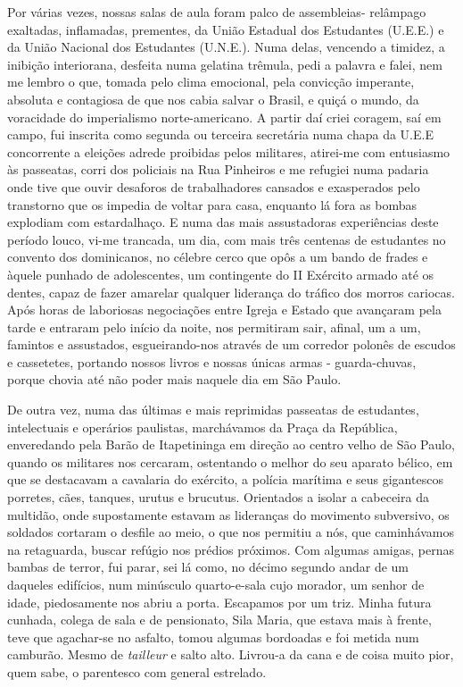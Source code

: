 Por várias vezes, nossas salas de aula foram palco de assembleias- relâmpago exaltadas, inflamadas, prementes, da União Estadual dos Estudantes (U.E.E.) e da União Nacional dos Estudantes (U.N.E.).
Numa delas, vencendo a timidez, a inibição interiorana, desfeita numa gelatina trêmula, pedi a palavra e falei, nem me lembro o que, tomada pelo clima emocional, pela convicção imperante, absoluta e contagiosa de que nos cabia salvar o Brasil, e quiçá o mundo, da voracidade do imperialismo norte-americano.
A partir daí criei coragem, saí em campo, fui inscrita como segunda ou terceira secretária numa chapa da U.E.E concorrente a eleições adrede proibidas pelos militares, atirei-me com entusiasmo às passeatas, corri dos policiais na Rua Pinheiros e me refugiei numa padaria onde tive que ouvir desaforos de trabalhadores cansados e exasperados pelo transtorno que os impedia de voltar para casa, enquanto lá fora as bombas explodiam com estardalhaço.
E numa das mais assustadoras experiências deste período louco, vi-me trancada, um dia, com mais três centenas de estudantes no convento dos dominicanos, no célebre cerco que opôs a um bando de frades e àquele punhado de adolescentes, um contingente do II Exército armado até os dentes, capaz de fazer amarelar qualquer liderança do tráfico dos morros cariocas.
Após horas de laboriosas negociações entre Igreja e Estado que avançaram pela tarde e entraram pelo início da noite, nos permitiram sair, afinal, um a um, famintos e assustados, esgueirando-nos através de um corredor polonês de escudos e cassetetes, portando nossos livros e nossas únicas armas - guarda-chuvas, porque chovia até não poder mais naquele dia em São Paulo.

De outra vez, numa das últimas e mais reprimidas passeatas de estudantes, intelectuais e operários paulistas, marchávamos da Praça da República, enveredando pela Barão de Itapetininga em direção ao centro velho de São Paulo, quando os militares nos cercaram, ostentando o melhor do seu aparato bélico, em que se destacavam a cavalaria do exército, a polícia marítima e seus gigantescos porretes, cães, tanques, urutus e brucutus.
Orientados a isolar a cabeceira da multidão, onde supostamente estavam as lideranças do movimento subversivo, os soldados cortaram o desfile ao meio, o que nos permitiu a nós, que caminhávamos na retaguarda, buscar refúgio nos prédios próximos.
Com algumas amigas, pernas bambas de terror, fui parar, sei lá como, no décimo segundo andar de um daqueles edifícios, num minúsculo quarto-e-sala cujo morador, um senhor de idade, piedosamente nos abriu a porta.
 Escapamos por um triz.
Minha futura cunhada, colega de sala e de pensionato, Sila Maria, que estava mais à frente, teve que agachar-se no asfalto, tomou algumas bordoadas e foi metida num camburão.
Mesmo de \textit{tailleur} e salto alto.
Livrou-a da cana e de coisa muito pior, quem sabe, o parentesco com general estrelado.


